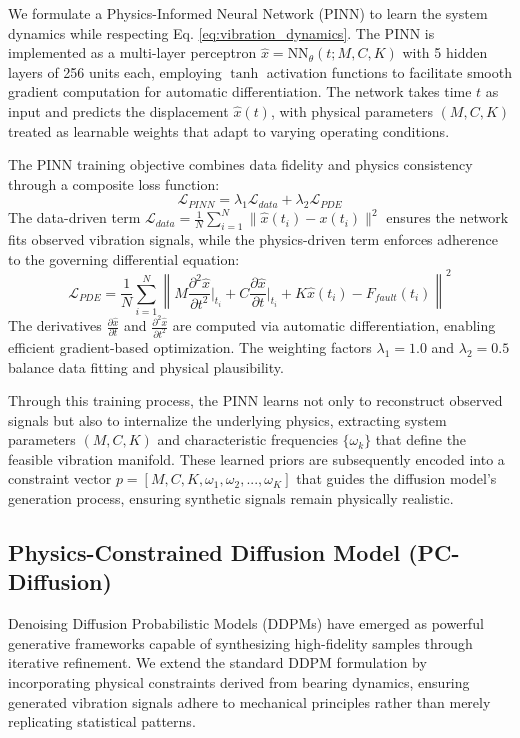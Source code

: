 \documentclass[journal]{IEEEtran}
\begin{document}
We formulate a Physics-Informed Neural Network (PINN) \cite{raissi2019physics} to learn the system dynamics while respecting Eq. \ref{eq:vibration_dynamics}. The PINN is implemented as a multi-layer perceptron $\hat{x} = \text{NN}_\theta(t; M, C, K)$ with 5 hidden layers of 256 units each, employing $\tanh$ activation functions to facilitate smooth gradient computation for automatic differentiation. The network takes time $t$ as input and predicts the displacement $\hat{x}(t)$, with physical parameters $(M, C, K)$ treated as learnable weights that adapt to varying operating conditions.

The PINN training objective combines data fidelity and physics consistency through a composite loss function:
\begin{equation}
    \mathcal{L}_{PINN} = \lambda_1 \mathcal{L}_{data} + \lambda_2 \mathcal{L}_{PDE}
    \label{eq:pinn_loss}
\end{equation}
The data-driven term $\mathcal{L}_{data} = \frac{1}{N}\sum_{i=1}^N \|\hat{x}(t_i) - x(t_i)\|^2$ ensures the network fits observed vibration signals, while the physics-driven term enforces adherence to the governing differential equation:
\begin{equation}
    \mathcal{L}_{PDE} = \frac{1}{N}\sum_{i=1}^N \left\| M\frac{\partial^2 \hat{x}}{\partial t^2}\bigg|_{t_i} + C\frac{\partial \hat{x}}{\partial t}\bigg|_{t_i} + K\hat{x}(t_i) - F_{fault}(t_i) \right\|^2
    \label{eq:pde_residual}
\end{equation}
The derivatives $\frac{\partial \hat{x}}{\partial t}$ and $\frac{\partial^2 \hat{x}}{\partial t^2}$ are computed via automatic differentiation, enabling efficient gradient-based optimization. The weighting factors $\lambda_1=1.0$ and $\lambda_2=0.5$ balance data fitting and physical plausibility.

Through this training process, the PINN learns not only to reconstruct observed signals but also to internalize the underlying physics, extracting system parameters $(M, C, K)$ and characteristic frequencies $\{\omega_k\}$ that define the feasible vibration manifold. These learned priors are subsequently encoded into a constraint vector $p = [M, C, K, \omega_1, \omega_2, ..., \omega_K]$ that guides the diffusion model's generation process, ensuring synthetic signals remain physically realistic.


\subsection{Physics-Constrained Diffusion Model (PC-Diffusion)}
Denoising Diffusion Probabilistic Models (DDPMs) \cite{ho2020denoising} have emerged as powerful generative frameworks capable of synthesizing high-fidelity samples through iterative refinement. We extend the standard DDPM formulation by incorporating physical constraints derived from bearing dynamics, ensuring generated vibration signals adhere to mechanical principles rather than merely replicating statistical patterns.
\end{document}
